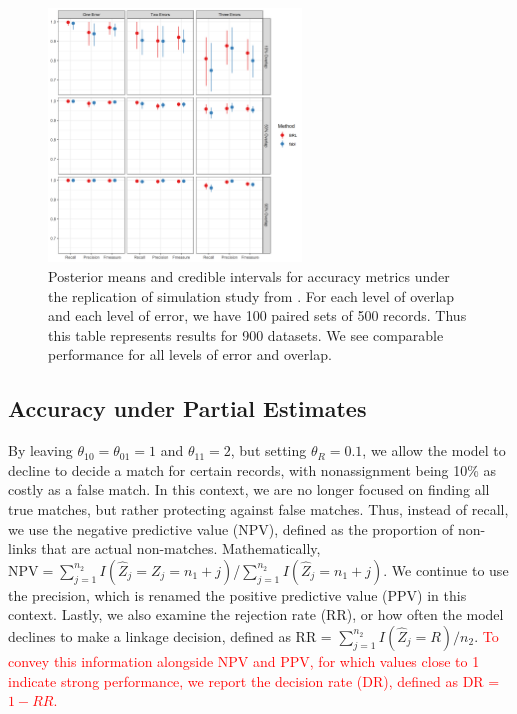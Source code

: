 \documentclass[ba]{imsart}
\begin{document}
	
	
	
	
	\begin{figure}[t]
		\begin{center}
			\includegraphics[width=0.6\textwidth]{../notes/figures/sadinle_sim_plot2} 
			\caption{Posterior means and credible intervals for accuracy metrics under the replication of simulation study from \cite{sadinle_bayesian_2017}. For each level of overlap and each level of error, we have 100 paired sets of 500 records. Thus this table represents results for 900 datasets. We see comparable performance for all levels of error and overlap.}
			\label{fig:sadinle_simulation}
		\end{center}
	\end{figure}
	
	\hypertarget{partial}{%
		\subsection{Accuracy under Partial Estimates}\label{partial}}
	
	By leaving $\theta_{10} = \theta_{01} = 1$ and $\theta_{11} = 2$, but setting $\theta_R = 0.1$, we allow the model to decline to decide a match for certain records, with nonassignment being 10\% as costly as a false match. In this context, we are no longer focused on finding all true matches, but rather protecting against false matches. Thus, instead of recall, we use the negative predictive value (NPV), defined as the proportion of non-links that are actual non-matches. Mathematically, $\text{NPV} = \sum_{j=1}^{n_2} I(\hat{Z}_j = Z_j = n_1 + j)$/$\sum_{j=1}^{n_2} I(\hat{Z}_j = n_1 + j)$. We continue to use the precision, which is renamed the positive predictive value (PPV) in this context. Lastly, we also examine the rejection rate (RR), or how often the model declines to make a linkage decision, defined as RR = $\sum_{j=1}^{n_2} I(\hat{Z}_j = R)/n_2$. \textcolor{red}{To convey this information alongside NPV and PPV, for which values close to 1 indicate strong performance, we report the decision rate (DR), defined as DR = $1 - RR$.}
	
\end{document}
